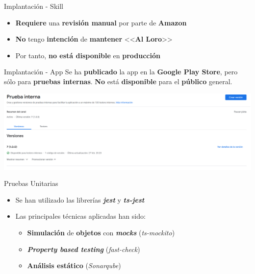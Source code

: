 \documentclass{beamer}
\begin{document}
  \begin{frame}{Implantación - Skill}
    \begin{itemize}
      \setlength\itemsep{1.5em}
      \item \textbf{Requiere} una \textbf{revisión manual} por parte de \textbf{Amazon}
      \item \textbf{No} tengo \textbf{intención} de \textbf{mantener} <<\textbf{Al Loro}>>
      \item Por tanto, \textbf{no está disponible} en \textbf{producción}
    \end{itemize}
  \end{frame}

  \begin{frame}{Implantación - App}
    Se ha \textbf{publicado} la app en la \textbf{Google Play Store}, pero sólo para \textbf{pruebas internas}. \textbf{No} está \textbf{disponible} para el \textbf{público} general.

    \vspace{1.5em}

    \includegraphics[width=\textwidth]{prueba-interna-google-play-console-completa.png}
  \end{frame}

  \begin{frame}{Pruebas Unitarias}
    \begin{itemize}
      \setlength\itemsep{1.5em}
      \item Se han utilizado las librerías \textbf{\emph{jest}} y \textbf{\emph{ts-jest}}
      \item Las principales técnicas aplicadas han sido:
      \vspace{1em}
      \begin{itemize}
        \setlength\itemsep{1em}
        \item \textbf{Simulación} de \textbf{objetos} con \textbf{\emph{mocks}} (\emph{ts-mockito})
        \item \textbf{\emph{Property based testing}} (\emph{fast-check})
        \item \textbf{Análisis estático} (\emph{Sonarqube})
      \end{itemize}
    \end{itemize}
  \end{frame}
\end{document}
